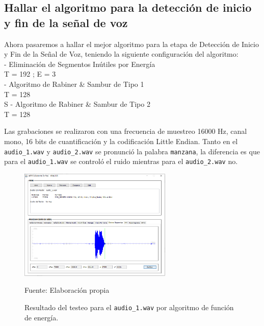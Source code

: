 

\subsection{Hallar el algoritmo para la detección de inicio y fin de la señal de voz}
Ahora pasaremos a hallar el mejor algoritmo para la etapa de Detección de Inicio y Fin de la Señal de Voz, teniendo la siguiente configuración del algoritmo: \\
- Eliminación de Segmentos Inútiles por Energía \\
\hspace*{1cm} T = 192 ; \qquad E = 3 \\
- Algoritmo de Rabiner \& Sambur de Tipo 1 \\
\hspace*{1cm} T = 128 \\S
- Algoritmo de Rabiner \& Sambur de Tipo 2 \\
\hspace*{1cm} T = 128 

Las grabaciones se realizaron con una frecuencia de muestreo 16000 Hz, canal mono, 16 bits de cuantificación y la codificación Little Endian. Tanto en el \texttt{audio\_1.wav} y \texttt{audio\_2.wav} se pronunció la palabra \texttt{manzana}, la diferencia es que para el \texttt{audio\_1.wav} se controló el ruido mientras para el \texttt{audio\_2.wav} no.

\begin{figure}[H]
\begin{center}
\includegraphics[width=0.65\textwidth]{Imagenes/Cap3/image071}
\end{center}
\begin{center}
\vskip -0.5cm
\caption{\small{Resultado del testeo para el \texttt{audio\_1.wav} por algoritmo de función de energía.}}
\label{fig:figura3.71}
{\small{Fuente: Elaboración propia}}
\end{center}
\end{figure}

